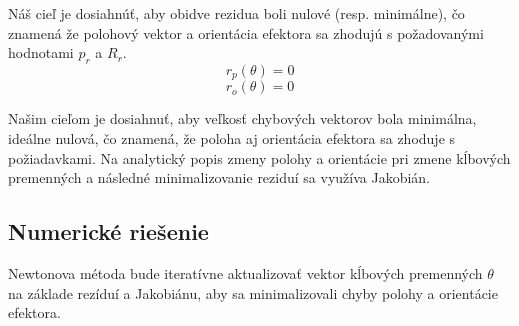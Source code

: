 Náš cieľ je dosiahnúť, aby obidve rezidua boli nulové (resp. minimálne), čo znamená že polohový vektor a orientácia efektora sa zhodujú s požadovanými hodnotami $p_r$ a $R_r$.
\begin{equation}
r_p(\theta) = 0
\end{equation}
\begin{equation}
r_o(\theta) = 0
\end{equation}

Našim cieľom je dosiahnuť, aby veľkosť chybových vektorov bola minimálna, ideálne nulová, čo znamená, že poloha aj orientácia efektora sa zhoduje s požiadavkami. Na analytický popis zmeny polohy a orientácie pri zmene kĺbových premenných a následné minimalizovanie reziduí sa využíva Jakobián.

\subsection{Numerické riešenie}
Newtonova métoda bude iteratívne aktualizovať vektor kĺbových premenných $\theta$ na základe rezíduí a Jakobiánu, aby sa minimalizovali chyby polohy a orientácie efektora.
